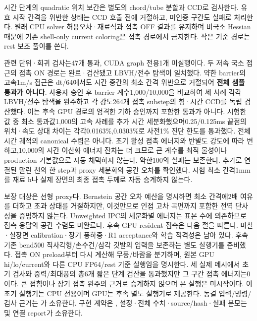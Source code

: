 \documentclass[10pt]{article}
\begin{document}
시간 단계의 quadratic 위치 보간은 별도의 chord/tube 분할과 CCD로 검사한다.
유효 시작 간격을 위반한 상태는 CCD 호출 전에 거절하고, 미인증 구간도 실패로 처리한다.
원래 CPU solver 허용오차·재료식과 접촉 OFF 결과를 유지하며 비국소 Hessian 때문에
기존 shell-only current coloring은 접촉 경로에서 금지한다. 작은 기준 경로는 rest 보조 풀이를 쓴다.

관련 단위·회귀 검사는47개 통과, CUDA graph 전용1개 미실행이다. 두 저속 국소 접근의
접촉 ON 경로는 완료·검산됐고 LBVH/전수 탐색이 일치했다. 약한 barrier의 고속1m/s 접근은
dt/64에서도 시간 중간의 최소 간격 위반으로 거절되어 \textbf{전체 샘플 통과가 아니다}.
사용자 승인 후 barrier 계수1,000/10,000을 비교하여 세 사례 각각 LBVH/전수 탐색을
완주하고 각 강도264개 접촉 substep의 힘·시간 CCD를 독립 검산했다. 이는 후속 GPU 경로의
엄격한  기하 승인까지 포함한 통과가 아니다. 시험한 값 중 최소 통과값1,000의
고속 사례를 추가 시간 세분화했으며0.25/0.125ms 끝점의 위치·속도 상대 차이는
각각0.0163\%,0.0303\%로 사전1\% 진단 한도를 통과했다. 전체 시간 궤적의 canonical 수렴은 아니다.
초기 활성 접촉 에너지와 반발도 강도에 따라 변하고,10,000의 시간 이산화 에너지 잔차는 더 크므로
큰 계수를 최적 물성이나 production 기본값으로 자동 채택하지 않는다. 약한100의 실패는 보존한다.
추가로 연결된 말린 천의 한 step과 proxy 세분화의 공간 오차를 확인했다.
시험 최소 간격1mm를 재료 h나 실제 장면의 최종 접촉 두께로 자동 승계하지 않는다.

보장 대상은 선형 proxy다. Bernstein 공간 오차 예산을 명시하면 최소 간격에2배 여유를
더하고 초과 상태를 거절하지만, 이것만으로 인접 고차 곡면까지 포함한 전역 단사성을 증명하지 않는다.
Unweighted IPC의 세분화별 에너지는 표본 수에 의존하므로 접촉 응답의 공간 수렴도 미완료다.
후속 GPU resident 접촉은 다음 절을 따른다. 마찰·실장면 calibration·장기 풍하중·R1 acceptance와 학습 적격성은 남아 있다.
후속 기존 bend500 직사각형/손수건/삼각 깃발의 입력을 보존하는 별도 실행기를 준비했다.
접촉 ON preload부터 다시 계산해 무풍/바람을 분기하며, 원본 GPU hi/lo/current와 다른
CPU FP64/rest 기준 실행임을 명시한다. 세 실제 메시에서 초기 검사와 중력/최대풍의
총6개 짧은 단계 검산을 통과했지만 그 구간 접촉 에너지는0이다. 큰 접힘이나 장기 접촉
완주의 근거로 승계하지 않으며 본 실행은 미시작이다. 이 초기 실행기는 CPU 전용이며
GPU는 후속 별도 실행기로 제공한다. 동결 입력/명령/검사 근거는
가 소유한다.
구현 계약은 , 설정·전체 수치·source/hash·실패 분모는
 및 연결 report가 소유한다.
\end{document}
